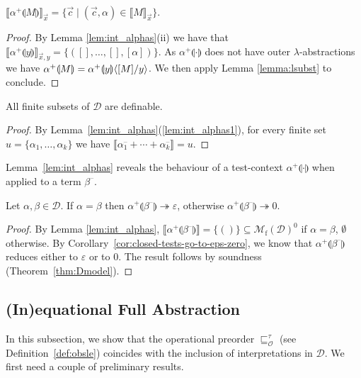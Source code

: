 \documentclass{LMCS}
\newcommand{\st}{ \mid }
\newcommand{\lam}{\ensuremath{\lambda}}
\renewcommand{\hole}[1]{\llparenthesis #1\rrparenthesis}
\newcommand{\msto}{\twoheadrightarrow}
\newcommand{\Tobsle}{\sqsubseteq^{\gt}_{\mathcal{O}}}
\newcommand{\Int}[1]{\llbracket #1\rrbracket} \newcommand{\trm}[1]{#1^{\textrm{--}}}
\newcommand{\cont}[2]{#1^{+}\hole{#2}}
\newcommand{\Mfin}[1]{\mathcal{M}_{\mathrm{f}}(#1)}
\newcommand{\seq}[1]{\vec{#1}}
\newcommand{\gt}{\ensuremath{\tau}}
\newcommand{\cD}{\mathcal{D}}
\begin{document}
\begin{cor}\label{cor:general-test}
$\Int{\cont{\alpha}{M}}_{\seq x} = \{\seq c \st (\seq c, \alpha)\in\Int{M}_{\seq x}\}$.
\end{cor}

\begin{proof}
By Lemma \ref {lem:int_alphas}(ii) we have that $\Int{\cont{\alpha}{y}}_{\seq x,y}=\{([],\ldots,[],[\alpha])\}$. 
As $\cont{\alpha}{\cdot}$ does not have outer $\lam$-abstractions we have  $\cont{\alpha}{M}=\cont{\alpha}{y}\lsubst{y}{[M]}$.
We then apply Lemma \ref{lemma:lsubst} to conclude.
\end{proof}

\begin{cor}
All finite subsets of $\cD$ are definable.
\end{cor}

\begin{proof} By Lemma~\ref{lem:int_alphas}(\ref{lem:int_alphas1}), 
for every finite set $u = \{\alpha_1,\ldots,\alpha_k\}$
we have $\Int{\trm{\alpha_1}+\cdots + \trm{\alpha_k}}=u$.
\end{proof}

Lemma~\ref{lem:int_alphas} reveals
the behaviour of a test-context $\cont{\alpha}{\cdot}$ when applied to a term $\trm{\beta}$.

\begin{cor}\label{lem:alpha-beta-to-eps-zero}
Let $\alpha,\beta\in \cD$. If $\alpha = \beta$ then $\cont{\alpha}{\trm{\beta}} \msto \varepsilon$,
otherwise $\cont{\alpha}{\trm{\beta}} \msto 0$.
\end{cor}

\begin{proof} 
By Lemma  \ref{lem:int_alphas},
$\Int{\cont{\alpha}{\trm{\beta}}}=\{()\}\subseteq\Mfin{\cD}^0$ 
if  $\alpha = \beta$, $\emptyset$ otherwise.
By Corollary~\ref{cor:closed-tests-go-to-eps-zero}, we know  that
$\cont{\alpha}{\trm{\beta}}$  reduces either to $\varepsilon$ or to $0$.
The result follows by soundness (Theorem~\ref{thm:Dmodel}).
\end{proof}

\subsection{(In)equational Full Abstraction}\label{subsec:FAres1}

In this subsection, we show that the operational preorder $\Tobsle$ 
(see Definition~\ref{def:obsle}) coincides with the inclusion of interpretations in $\cD$. 
We first need a couple of preliminary results.
\end{document}

